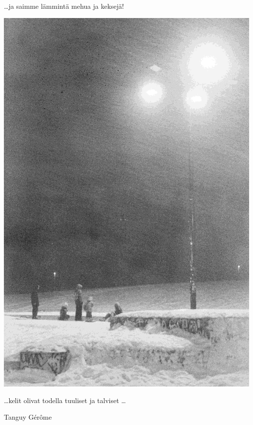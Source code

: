 \begin{multicols}{2}
	\ldots ja saimme lämmintä mehua ja \mbox{keksejä!}
	\columnbreak

	\vspace*{1.28cm}
	\noindent\includegraphics[width=\linewidth]{assets/laskiaistiistai4}

	\ldots kelit olivat todella tuuliset ja \mbox{talviset} \ldots

	\vfill
	\medskip
	\noindent\null\hfill Tanguy Gérôme

\end{multicols}
